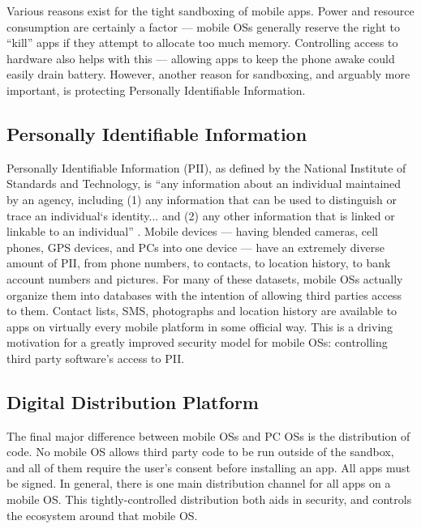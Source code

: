 Various reasons exist for the tight sandboxing of mobile apps. Power and resource consumption are certainly a factor --- mobile OSs generally reserve the right to ``kill'' apps if they attempt to allocate too much memory. Controlling access to hardware also helps with this --- allowing apps to keep the phone awake could easily drain battery. However, another reason for sandboxing, and arguably more important, is protecting Personally Identifiable Information.

\subsection{Personally Identifiable Information}

Personally Identifiable Information (PII), as defined by the National Institute of Standards and Technology, is ``any information about an individual maintained by an agency, including (1) any information that can be used to distinguish or trace an individual‘s identity... and (2) any other information that is linked or linkable to an individual'' \citep{mccallister2010guide}. Mobile devices --- having blended cameras, cell phones, GPS devices, and PCs into one device --- have an extremely diverse amount of PII, from phone numbers, to contacts, to location history, to bank account numbers and pictures. For many of these datasets, mobile OSs actually organize them into databases with the intention of allowing third parties access to them. Contact lists, SMS, photographs and location history are available to apps on virtually every mobile platform in some official way. This is a driving motivation for a greatly improved security model for mobile OSs: controlling third party software's access to PII. 


\subsection{Digital Distribution Platform}

The final major difference between mobile OSs and PC OSs is the distribution of code. No mobile OS allows third party code to be run outside of the sandbox, and all of them require the user's consent before installing an app. All apps must be signed. In general, there is one main distribution channel for all apps on a mobile OS. This tightly-controlled distribution both aids in security, and controls the ecosystem around that mobile OS.

